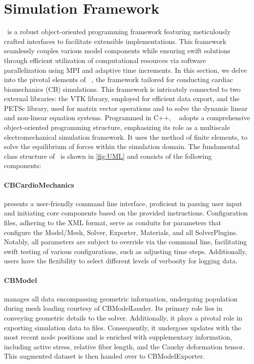 \section{Simulation Framework}
\label{sec:SimFramework}

\CM~is a robust object-oriented programming framework featuring meticulously crafted interfaces to facilitate extensible implementations. 
This framework seamlessly couples various model components while ensuring swift solutions through efficient utilization of computational resources via software parallelization using MPI and adaptive time increments.
In this section, we delve into the pivotal elements of \CM~, the framework tailored for conducting cardiac biomechanics (CB) simulations. 
This framework is intricately connected to two external libraries: the VTK library, employed for efficient data export, and the PETSc library, used for matrix vector operations and to solve the dynamic linear and non-linear equation systems. 
Programmed in C++, \CM~ adopts a comprehensive object-oriented programming structure, emphasizing its role as a multiscale electromechanical simulation framework.
It uses the method of finite elements, to solve the equilibrium of forces within the simulation domain.
The fundamental class structure of \CM~is shown in \autoref{fig:UML} and consists of the following components:
\paragraph{CBCardioMechanics} presents a user-friendly command line interface, proficient in parsing user input and initiating core components based on the provided instructions. 
Configuration files, adhering to the XML format, serve as conduits for parameters that configure the Model/Mesh, Solver, Exporter, Materials, and all SolverPlugins. 
Notably, all parameters are subject to override via the command line, facilitating swift testing of various configurations, such as adjusting time steps. 
Additionally, users have the flexibility to select different levels of verbosity for logging data.

\paragraph{CBModel} manages all data encompassing geometric information, undergoing population during mesh loading courtesy of CBModelLoader. 
Its primary role lies in conveying geometric details to the solver. 
Additionally, it plays a pivotal role in exporting simulation data to  files. 
Consequently, it undergoes updates with the most recent node positions and is enriched with supplementary information, including active stress, relative fiber length, and the Cauchy deformation tensor. 
This augmented dataset is then handed over to CBModelExporter.

